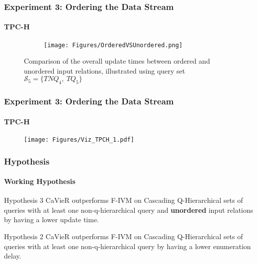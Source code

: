 \documentclass[
	11pt, %
]{beamer}
\begin{document}
\begin{frame}
	\frametitle{Experiment 3: Ordering the Data Stream}
	\framesubtitle{TPC-H}
	\begin{figure}


		\begin{minipage}{0.25\textwidth}
		\end{minipage}
		\begin{minipage}{0.74\textwidth}
			\begin{figure}
				\centering
				\texttt{[image: Figures/OrderedVSUnordered.png]}
			\end{figure}
		\end{minipage}
		\caption{Comparison of the overall update times between ordered and unordered input relations, illustrated using query set $\mathcal{S}_5 = \{TNQ_4,\ TQ_5\}$}
		\label{fig:orderedVSunordered}
	\end{figure}
\end{frame}


\begin{frame}
	\frametitle{Experiment 3: Ordering the Data Stream}
	\framesubtitle{TPC-H}
	\begin{figure}
		\texttt{[image: Figures/Viz\_TPCH\_1.pdf]}
	\end{figure}
\end{frame}

\begin{frame}
	\frametitle{Hypothesis}
	\framesubtitle{Working Hypothesis}
	\begin{block}{Hypothesis 3}
			CaVieR outperforms F-IVM on Cascading Q-Hierarchical sets of queries with at least one non-q-hierarchical query and \textbf{unordered} input relations by having a lower update time.
	\end{block}
		\begin{block}{Hypothesis 2}
		CaVieR outperforms F-IVM on Cascading Q-Hierarchical sets of queries with at least one non-q-hierarchical query by having a lower enumeration delay.
	\end{block}
	
\end{frame}
\end{document}
